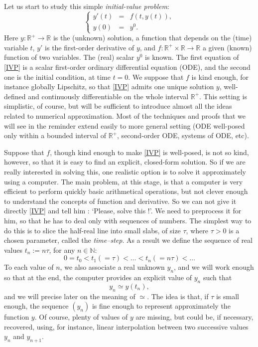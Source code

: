 \documentclass{article}
\begin{document}
Let us start to study this simple \emph{initial-value problem}:
\begin{equation} \label{IVP}
\left \{
\begin{array}{rcl}
y'(t) &=& f(t,y(t)),\\
y(0) &=& y^0.
\end{array}
\right .
\end{equation}
Here $y : \mathbb{R}^+ \rightarrow \mathbb{R}$ is the (unknown) solution, a function that depends on the (time) variable $t$, $y'$ is the first-order derivative of $y$, and $f : \mathbb{R}^+ \times \mathbb{R} \rightarrow \mathbb{R}$ a given (known) function of two variables. The (real) scalar $y^0$ is known. The first equation of \eqref{IVP} is a scalar first-order ordinary differential equation (ODE), and the second one is the initial condition, at time $t=0$. We suppose that $f$ is kind enough, for instance globally Lipschitz, so that \eqref{IVP} admits one unique solution $y$, well-defined and continuously differentiable on the whole interval $\mathbb{R}^+$. %
This setting is simplistic, of course, but will be sufficient to introduce almost all the ideas related to numerical approximation. Most of the techniques and proofs that we will see in the reminder extend easily to more general setting (ODE well-posed only within a bounded interval of $\mathbb{R}^+$, second-order ODE, systems of ODE, etc).


Suppose that $f$, though kind enough to make \eqref{IVP} is well-posed, is not so kind, however, so that it is easy to find an explicit, closed-form solution. So if we are really interested in solving this, one realistic option is to solve it approximately using a computer. The main problem, at this stage, is that a computer is very efficient to perform quickly basic arithmetical operations, but not clever enough to understand the concepts of function and derivative. So we can not give it directly \eqref{IVP} and tell him : `Please, solve this !'. We need to preprocess it for him, so that he has to deal only with sequences of numbers. The simplest way to do this is to slice the half-real line into small slabs, of size $\tau$, where $\tau > 0$ is a chosen parameter, called the \emph{time--step}. As a result we define the sequence of real values $t_n := n \tau$, for any $n \in \mathbb{N}$:
\[
0 = t_0 < t_1(=\tau) < \ldots < t_n (=n\tau) < \ldots
\]
To each value of $n$, we also associate a real unknown $y_n$, and we will work enough so that at the end, the computer provides an explicit value of $y_n$ such that
\[
y_n \simeq y(t_n),
\]
and we will precise later on the meaning of $\simeq$. The idea is that, if $\tau$ is small enough, the sequence $(y_n)$ is fine enough to represent approximately the function $y$. Of course, plenty of values of $y$ are missing, but could be, if necessary, recovered, using, for instance, linear interpolation between two successive values $y_n$ and $y_{n+1}$.
\end{document}
